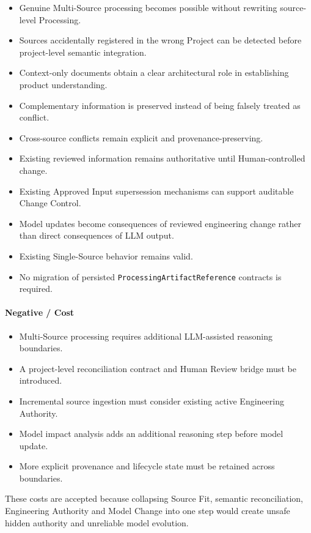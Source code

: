\begin{itemize}
\tightlist
\item
  Genuine Multi-Source processing becomes possible without rewriting source-level Processing.
\item
  Sources accidentally registered in the wrong Project can be detected before project-level semantic integration.
\item
  Context-only documents obtain a clear architectural role in establishing product understanding.
\item
  Complementary information is preserved instead of being falsely treated as conflict.
\item
  Cross-source conflicts remain explicit and provenance-preserving.
\item
  Existing reviewed information remains authoritative until Human-controlled change.
\item
  Existing Approved Input supersession mechanisms can support auditable Change Control.
\item
  Model updates become consequences of reviewed engineering change rather than direct consequences of LLM output.
\item
  Existing Single-Source behavior remains valid.
\item
  No migration of persisted \texttt{ProcessingArtifactReference} contracts is required.
\end{itemize}

\hypertarget{negative--cost-1}{%
\paragraph{Negative / Cost}\label{negative--cost-1}}

\begin{itemize}
\tightlist
\item
  Multi-Source processing requires additional LLM-assisted reasoning boundaries.
\item
  A project-level reconciliation contract and Human Review bridge must be introduced.
\item
  Incremental source ingestion must consider existing active Engineering Authority.
\item
  Model impact analysis adds an additional reasoning step before model update.
\item
  More explicit provenance and lifecycle state must be retained across boundaries.
\end{itemize}

These costs are accepted because collapsing Source Fit, semantic reconciliation, Engineering Authority and Model Change into one step would create unsafe hidden authority and unreliable model evolution.

